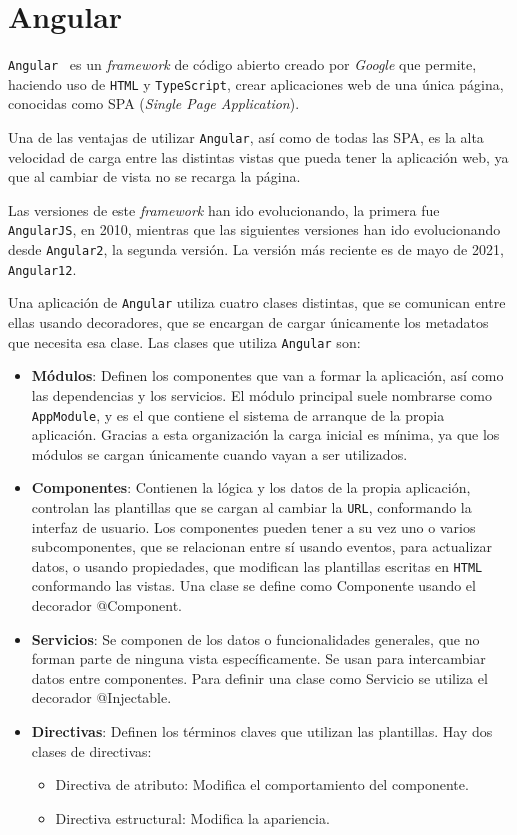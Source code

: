 \documentclass[a4paper, 12pt]{book}
\begin{document}
\section{Angular}
\label{sec:angular}

\texttt{Angular}~\cite{angularjs} es un \textit{framework} de código abierto creado por \textit{Google} que permite, haciendo uso de \texttt{HTML} y \texttt{TypeScript}, crear aplicaciones web de una única página, conocidas como SPA (\textit{Single Page Application}).

Una de las ventajas de utilizar \texttt{Angular}, así como de todas las SPA, es la alta velocidad de carga entre las distintas vistas que pueda tener la aplicación web, ya que al cambiar de vista no se recarga la página.

Las versiones de este \textit{framework} han ido evolucionando, la primera fue \texttt{AngularJS}, en 2010, mientras que las siguientes versiones han ido evolucionando desde \texttt{Angular2}, la segunda versión. La versión más reciente es de mayo de 2021, \texttt{Angular12}.

Una aplicación de \texttt{Angular} utiliza cuatro clases distintas, que se comunican entre ellas usando decoradores, que se encargan de cargar únicamente los metadatos que necesita esa clase. Las clases que utiliza \texttt{Angular} son:

\begin{itemize}
	\item \textbf{Módulos}: Definen los componentes que van a formar la aplicación, así como las dependencias y los servicios. El módulo principal suele nombrarse como \texttt{AppModule}, y es el que contiene el sistema de arranque de la propia aplicación. Gracias a esta organización la carga inicial es mínima, ya que los módulos se cargan únicamente cuando vayan a ser utilizados.
	\item \textbf{Componentes}: Contienen la lógica y los datos de la propia aplicación, controlan las plantillas que se cargan al cambiar la \texttt{URL}, conformando la interfaz de usuario. Los componentes pueden tener a su vez uno o varios subcomponentes, que se relacionan entre sí usando eventos, para actualizar datos, o usando propiedades, que modifican las plantillas escritas en \texttt{HTML} conformando las vistas. Una clase se define como Componente usando el decorador @Component.
	\item \textbf{Servicios}: Se componen de los datos o funcionalidades generales, que no forman parte de ninguna vista específicamente. Se usan para intercambiar datos entre componentes. Para definir una clase como Servicio se utiliza el decorador @Injectable.
	\item \textbf{Directivas}: Definen los términos claves que utilizan las plantillas. Hay dos clases de directivas:
	\begin{itemize}
		\item Directiva de atributo: Modifica el comportamiento del componente.
		\item Directiva estructural: Modifica la apariencia.
	\end{itemize}
\end{itemize}
\end{document}
